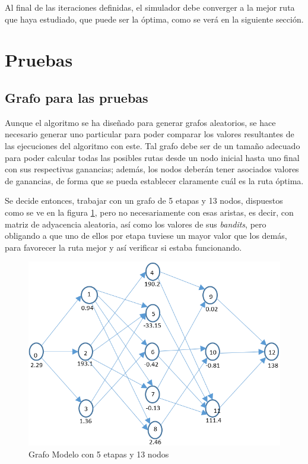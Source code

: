 Al final de las iteraciones definidas, el simulador debe converger a la mejor ruta que haya estudiado, que puede ser la óptima, como se verá en la siguiente sección.

\section{Pruebas}

\subsection{Grafo para las pruebas}

Aunque el algoritmo se ha diseñado para generar grafos aleatorios, se hace necesario generar uno particular para poder comparar los valores resultantes de las ejecuciones del algoritmo con este. Tal grafo debe ser de un tamaño adecuado para poder calcular todas las posibles rutas desde un nodo inicial hasta uno final con sus respectivas ganancias; además, los nodos deberán tener asociados valores de ganancias, de forma que se pueda establecer claramente cuál es la ruta óptima.

Se decide entonces, trabajar con un grafo de 5 etapas y 13 nodos, dispuestos como se ve en la figura \ref{Grafomodelo}, pero no necesariamente con esas aristas, es decir, con matriz de adyacencia aleatoria, así como los valores de sus \textit{bandits}, pero obligando a que uno de ellos por etapa tuviese un mayor valor que los demás, para favorecer la ruta mejor y así verificar si estaba funcionando.

\begin{figure}[h]
  \centering
    \includegraphics[scale=0.5]{Grafo5L.png}
  \caption[Grafo Modelo]{Grafo Modelo con 5 etapas y 13 nodos}
  \label{Grafomodelo}
\end{figure}


